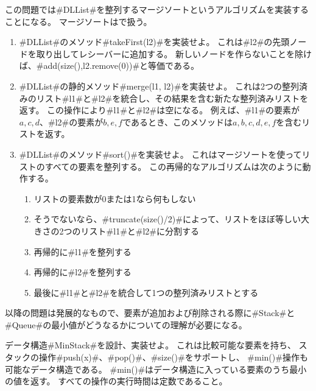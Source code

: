 \begin{exc}
  この問題では#DLList#を整列するマージソートというアルゴリズムを実装することになる。
  マージソートはで扱う。
  \begin{enumerate}
    \item #DLList#のメソッド#takeFirst(l2)#を実装せよ。
	これは#l2#の先頭ノードを取り出してレシーバーに追加する。
	新しいノードを作らないことを除けば、#add(size(),l2.remove(0))#と等価である。
    \item #DLList#の静的メソッド#merge(l1, l2)#を実装せよ。
	これは2つの整列済みのリスト#l1#と#l2#を統合し、その結果を含む新たな整列済みリストを返す。
	この操作により#l1#と#l2#は空になる。
	例えば、#l1#の要素が$a,c,d$、#l2#の要素が$b,e,f$であるとき、このメソッドは$a,b,c,d,e,f$を含むリストを返す。
    \item #DLList#のメソッド#sort()#を実装せよ。
	これはマージソートを使ってリストのすべての要素を整列する。
	この再帰的なアルゴリズムは次のように動作する。
       \begin{enumerate}
          \item リストの要素数が0または1なら何もしない
          \item そうでないなら、#truncate(size()/2)#によって、リストをほぼ等しい大きさの2つのリスト#l1#と#l2#に分割する
          \item 再帰的に#l1#を整列する
          \item 再帰的に#l2#を整列する
          \item 最後に#l1#と#l2#を統合して1つの整列済みリストとする
       \end{enumerate}
  \end{enumerate}
\end{exc}

以降の問題は発展的なもので、要素が追加および削除される際に#Stack#と#Queue#の最小値がどうなるかについての理解が必要になる。

\begin{exc}
  データ構造#MinStack#を設計、実装せよ。
  これは比較可能な要素を持ち、
  スタックの操作#push(x)#、#pop()#、#size()#をサポートし、
  #min()#操作も可能なデータ構造である。
  #min()#はデータ構造に入っている要素のうち最小の値を返す。
  すべての操作の実行時間は定数であること。
\end{exc}

